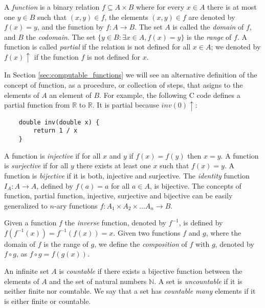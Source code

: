 
A \emph{function} is a binary relation $f \subseteq A \times B$ where for every $x \in A$ there is at most one $y \in B$ such that $\left(x, y\right) \in f$, the elements $\left(x, y\right) \in f$ are denoted by $f(x)=y$, and the function by $f : A \rightarrow B$. The set $A$ is called the \emph{domain} of $f$, and $B$ the \emph{codomain}. The set $\{ y \in B : \exists x \in A , f(x) = y\}$ is the \emph{range} of $f$. A function is called \emph{partial} if the relation is not defined for all $x \in A$; we denoted by $f(x) \uparrow$ if the function $f$ is not defined for $x$. 

\begin{example}
In Section \ref{sec:computable_functions} we will see an alternative definition of the concept of function, as a procedure, or collection of steps, that asigns to the elements of $A$ an element of $B$. For example, the following C code defines a partial function from $\mathbb{R}$ to $\mathbb{R}$. It is partial because $inv(0)\uparrow$:
\begin{verbatim}
    double inv(double x) {
        return 1 / x
    }
\end{verbatim}
\end{example}

A function is \emph{injective} if for all $x$ and $y$ if $f(x) = f(y)$ then $x=y$. A function is \emph{surjective} if for all $y$ there exists at least one $x$ such that $f(x) = y$. A function is \emph{bijective} if it is both, injective and surjective. The \emph{identity} function $I_A : A \rightarrow A$, defined by $f(a) = a$ for all $a \in A$, is bijective. The concepts of function, partial function, injective, surjective and bijective can be easily generalized to $n$-ary functions $f: A_1 \times A_2 \times \dots A_n \rightarrow B$.

Given a function $f$ the \emph{inverse} function, denoted by $f^{-1}$, is defined by $f(f^{-1}(x)) = f^{-1}(f(x)) = x$. Given two functions $f$ and $g$, where the domain of $f$ is the range of $g$, we define the \emph{composition} of $f$ with $g$, denoted by $f \circ g$, as $f \circ g = f(g(x))$.

An infinite set $A$ is \emph{countable} if there exists a bijective function between the elements of $A$ and the set of natural numbers $\mathbb{N}$. A set is \emph{uncountable} if it is neither finite nor countable. We say that a set has \emph{countable many} elements if it is either finite or countable.

